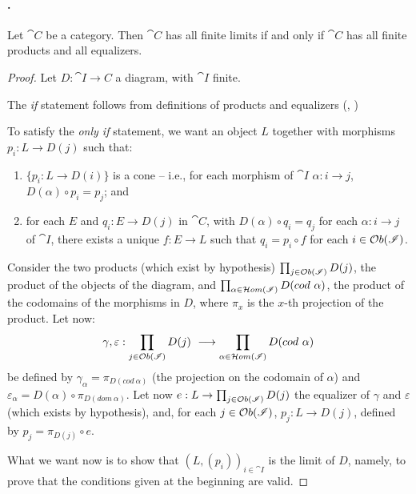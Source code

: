 \documentclass[a4paper, twoside,openright]{report}
\theoremstyle{plain}
\theoremstyle{definition}
\begin{document}
\paragraph{.}
 Let $\cat C$ be a category. Then $\cat C$ has all finite limits if and only if $\cat C$ has all finite products and all equalizers.
\begin{proof}
    Let $D: \cat{I \rightarrow C}$ a diagram, with $\cat I$ finite.
    
    The \emph{if} statement follows from definitions of products and equalizers (, )

    To satisfy the \emph{only if} statement, we want an object $L$ together with morphisms $p_i : L \rightarrow D(j)$ such that:
    \begin{enumerate}
        \item\label{item:cone} $\{p_i: L \rightarrow D(i)\}$ is a cone -- i.e., for each morphism of $\cat I$ $\alpha : i \rightarrow j$, $D(\alpha) \circ p_i = p_j$; and
        \item\label{item:univ_prop} for each $E$ and $q_i : E \rightarrow D(j)$ in $\cat C$, with $D(\alpha) \circ q_i = q_j$ for each $\alpha : i \rightarrow j$ of $\cat I$, there exists a unique $f: E \rightarrow L$ such that $q_i = p_i \circ f$ for each $i \in \mathcal{O}b(\mathscr{I})$.
    \end{enumerate}

    Consider the two products (which exist by hypothesis) $\prod_{j \in \mathcal{O}b(\mathscr{I})} D(j)$, the product of the objects of the diagram, and $\prod_{\alpha \in \Hom(\cat I)}D(cod \ \alpha)$, the product of the codomains of the morphisms in $D$, where $\pi_x$ is the $x$-th projection of the product.
    Let now:
    \[
        \gamma, \varepsilon : \prod_{j \in \mathcal{O}b(\mathscr{I})}D(j) \ \longrightarrow \prod_{\alpha \in \mathcal{H}om(\mathscr{I})} D(cod \ \alpha)
    \]
    be defined by $\gamma_\alpha = \pi_{D(cod\ \alpha)}$ (the projection on the codomain of $\alpha$) and $\varepsilon_\alpha = D(\alpha) \circ \pi_{D(dom \ \alpha)}$.
    Let now $e: L \rightarrow \prod_{j \in \mathcal{O}b(\mathscr{I})}D(j)$ the equalizer of $\gamma$ and $\varepsilon$ (which exists by hypothesis), and, for each $j \in \mathcal{O}b(\mathscr{I})$, $p_j: L \rightarrow D(j)$, defined by $p_j = \pi_{D(j)} \circ e$.
    
    What we want now is to show that $(L, (p_i))_{i \in \cat I}$ is the limit of $D$, namely, to prove that the conditions given at the beginning are valid.


\end{proof}
\end{document}
